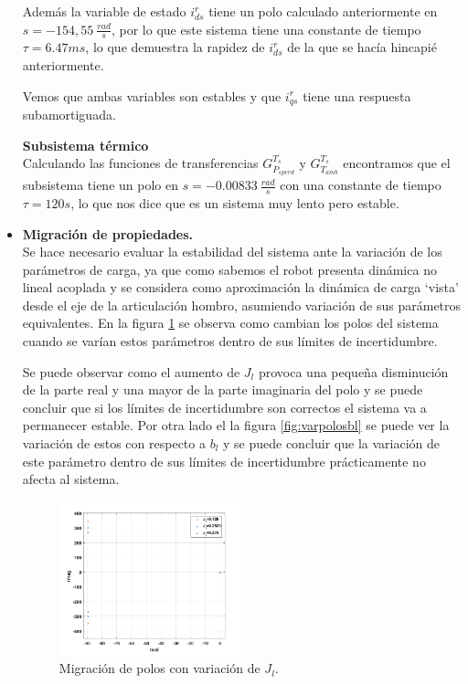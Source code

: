 \documentclass[10pt]{article}
\begin{document}
\begin{itemize}
Además la variable de estado $i^{r}_{ds}$ tiene un polo calculado anteriormente en $s=-154,55\ \frac{rad}{s}$, por lo que este sistema tiene una constante de tiempo $\tau=6.47 ms$, lo que demuestra la rapidez de $i^{r}_{ds}$ de la que se hacía hincapié anteriormente.

Vemos que ambas variables son estables y que $i^{r}_{qs}$ tiene una respuesta subamortiguada.

\vspace{0.2cm}
\subitem \textbf{Subsistema térmico}\vspace{0.2cm} \\
Calculando las funciones de transferencias  $G^{T_{s}}_{P_{s perd}}$ y $G^{T_{s}}_{T_{amb}}$ encontramos que el subsistema tiene un polo en $s=-0.00833\ \frac{rad}{s}$ con una constante de tiempo $\tau=120 s$, lo que nos dice que es un sistema muy lento pero estable.
\newpage
\item \textbf{Migración de propiedades.}\vspace{0.2cm}\\
Se hace necesario evaluar la estabilidad del sistema ante la variación de los parámetros de carga, ya que como sabemos el robot presenta dinámica no lineal acoplada y se considera como aproximación la dinámica de carga `vista' desde el eje de la articulación hombro, asumiendo variación de sus parámetros equivalentes. En la figura \ref{fig:varpolos} se observa como cambian los polos del sistema cuando se varían estos parámetros dentro de sus límites de incertidumbre.

	Se puede observar como el aumento de $J_{l}$ provoca una pequeña disminución de la parte real y una mayor de la parte imaginaria del polo y se puede concluir que si los límites de incertidumbre son correctos el sistema va a permanecer estable. Por otra lado el la figura \ref{fig:varpolosbl} se puede ver la variación de estos con respecto a $b_{l}$ y se puede concluir que la variación de este parámetro dentro de sus límites de incertidumbre prácticamente no afecta al sistema.
	
	\begin{figure}[h!]
	\centering
	\includegraphics[width=0.5\textwidth]{varpolos.png}
	\caption{\label{fig:varpolos} Migración de polos con variación de $J_{l}$.}
	\end{figure}
	

\end{itemize}
\end{document}
